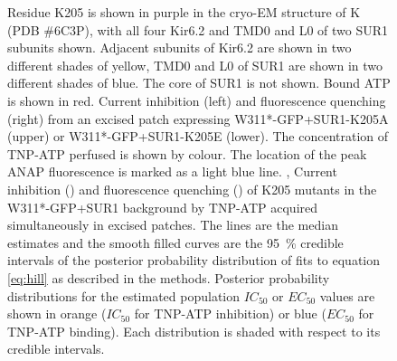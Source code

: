 \begin{figure}[hbtp]
{	 Residue K205 is shown in purple in the cryo-EM structure of K\ATP{} (PDB \#6C3P), with all four Kir6.2 and TMD0 and L0 of two SUR1 subunits shown.
	Adjacent subunits of Kir6.2 are shown in two different shades of yellow, TMD0 and L0 of SUR1 are shown in two different shades of blue.
	The core of SUR1 is not shown.
	Bound ATP is shown in red.
	 Current inhibition (left) and fluorescence quenching (right) from an excised patch expressing W311*-GFP+SUR1-K205A (upper) or W311*-GFP+SUR1-K205E (lower).
	The concentration of TNP-ATP perfused is shown by colour.
	The location of the peak ANAP fluorescence is marked as a light blue line.
	,  Current inhibition () and fluorescence quenching () of K205 mutants in the W311*-GFP+SUR1 background by TNP-ATP acquired simultaneously in excised patches.
	The lines are the median estimates and the smooth filled curves are the \SI{95}{\percent} credible intervals of the posterior probability distribution of fits to equation \ref{eq:hill} as described in the methods.
	 Posterior probability distributions for the estimated population $IC_{50}$ or $EC_{50}$ values are shown in orange ($IC_{50}$ for TNP-ATP inhibition) or blue ($EC_{50}$ for TNP-ATP binding).
	Each distribution is shaded with respect to its credible intervals.
	}\label{ch6fig:k205_fig1}
\end{figure}

